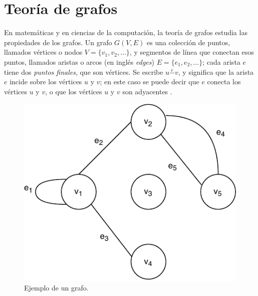 


\section{Teoría de grafos}\label{graph theory}
En matemáticas y en ciencias de la computación, la teoría de grafos estudia las propiedades de los grafos. Un grafo \( G(V,E) \) es una colección de puntos, llamados vértices o nodos \( V = \{ v_1, v_2, \dots \} \), y segmentos de línea que conectan esos puntos, llamados aristas o arcos (en inglés \textit{edges}) \( E = \{ e_1, e_2, \dots \} \); cada arista \( e \) tiene dos \textit{puntos finales}, que son vértices. Se escribe \( u \overset{e}{-} v \), y significa que la arista \( e \) incide sobre los vértices \( u \) y \( v \); en este caso se puede decir que \( e \) conecta los vértices \( u \) y \( v \), o que los vértices \( u \) y \( v \) son adyacentes \cite{even2011graph}.

\begin{figure}[H]
	\centering
	\includegraphics[width=0.35\linewidth]{document/GraphTheory/images/example-of-a-graph}
	\caption{Ejemplo de un grafo. \cite{even2011graph}}
	\label{fig:example-of-a-graph}
\end{figure}

